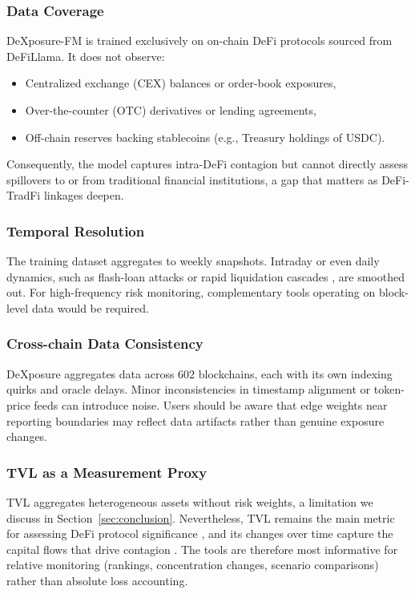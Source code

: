 \subsubsection{Data Coverage}
DeXposure-FM is trained exclusively on on-chain DeFi protocols sourced from DeFiLlama. It does not observe:
\begin{itemize}
  \item Centralized exchange (CEX) balances or order-book exposures,
  \item Over-the-counter (OTC) derivatives or lending agreements,
  \item Off-chain reserves backing stablecoins (e.g., Treasury holdings of USDC).
\end{itemize}
Consequently, the model captures intra-DeFi contagion but cannot directly assess spillovers to or from traditional financial institutions, a gap that matters as DeFi-TradFi linkages deepen.

\subsubsection{Temporal Resolution}
The training dataset aggregates to weekly snapshots. Intraday or even daily dynamics, such as flash-loan attacks \citep{Qin2021FlashLoans} or rapid liquidation cascades \citep{Warmuz2023ToxicLiquidationSpirals}, are smoothed out. For high-frequency risk monitoring, complementary tools operating on block-level data would be required.

\subsubsection{Cross-chain Data Consistency}
DeXposure aggregates data across 602 blockchains, each with its own indexing quirks and oracle delays. Minor inconsistencies in timestamp alignment or token-price feeds can introduce noise. Users should be aware that edge weights near reporting boundaries may reflect data artifacts rather than genuine exposure changes.

\subsubsection{TVL as a Measurement Proxy}
TVL aggregates heterogeneous assets without risk weights, a limitation we discuss in Section~\ref{sec:conclusion}. Nevertheless, TVL remains the main metric for assessing DeFi protocol significance \citep{BIS2025TVL}, and its changes over time capture the capital flows that drive contagion \citep{ZhangEtAl2026TVLDynamics}. The tools are therefore most informative for relative monitoring (rankings, concentration changes, scenario comparisons) rather than absolute loss accounting.

